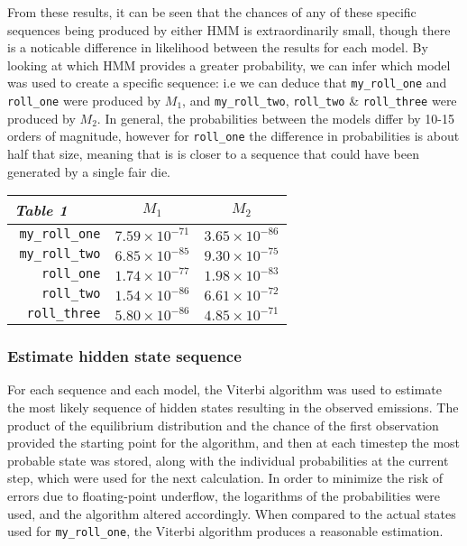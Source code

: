 \documentclass[10pt]{article}
\begin{document}
\begin{multicols}{2}
From these results, it can be seen that the chances of any of these specific sequences being produced by either HMM is extraordinarily small, though there is a noticable difference in likelihood between the results for each model. By looking at which HMM provides a greater probability, we can infer which model was used to create a specific sequence: i.e we can deduce that \texttt{my\_roll\_one} and \texttt{roll\_one} were produced by $M_1$, and \texttt{my\_roll\_two}, \texttt{roll\_two} \& \texttt{roll\_three} were produced by $M_2$. In general, the probabilities between the models differ by 10-15 orders of magnitude, however for \texttt{roll\_one} the difference in probabilities is about half that size, meaning that is is closer to a sequence that could have been generated by a single fair die.
\begin{center}
\begin{tabular}{r|c|c|}
\emph{Table 1}\ \ \ \ & $M_1$ & $M_2$ \\
\hline 
\texttt{my\_roll\_one} & $7.59\times10^{-71}$ & $3.65\times10^{-86}$ \\
\texttt{my\_roll\_two} & $6.85\times10^{-85}$ & $9.30\times10^{-75}$ \\
\texttt{roll\_one} & $1.74\times10^{-77}$ & $1.98\times10^{-83}$ \\
\texttt{roll\_two} & $1.54\times10^{-86}$ & $6.61\times10^{-72}$ \\
\texttt{roll\_three} & $5.80\times10^{-86}$ & $4.85\times10^{-71}$ \\
\hline	
\end{tabular}
\end{center}

\subsubsection*{Estimate hidden state sequence}
For each sequence and each model, the Viterbi algorithm was used to estimate the most likely sequence of hidden states resulting in the observed emissions. The product of the equilibrium distribution and the chance of the first observation provided the starting point for the algorithm, and then at each timestep the most probable state was stored, along with the individual probabilities at the current step, which were used for the next calculation. In order to minimize the risk of errors due to floating-point underflow, the logarithms of the probabilities were used, and the algorithm altered accordingly. When compared to the actual states used for \texttt{my\_roll\_one}, the Viterbi algorithm produces a reasonable estimation.
\end{multicols}
\end{document}
